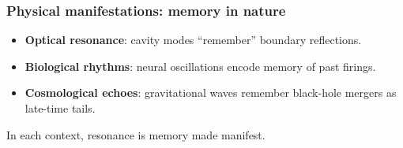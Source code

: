 \subsubsection{Physical manifestations: memory in nature}

\begin{itemize}[leftmargin=1.5em]
  \item \textbf{Optical resonance}: cavity modes “remember” boundary reflections.
  \item \textbf{Biological rhythms}: neural oscillations encode memory of past firings.
  \item \textbf{Cosmological echoes}: gravitational waves remember black-hole mergers as late-time tails.
\end{itemize}
In each context, resonance is memory made manifest.
